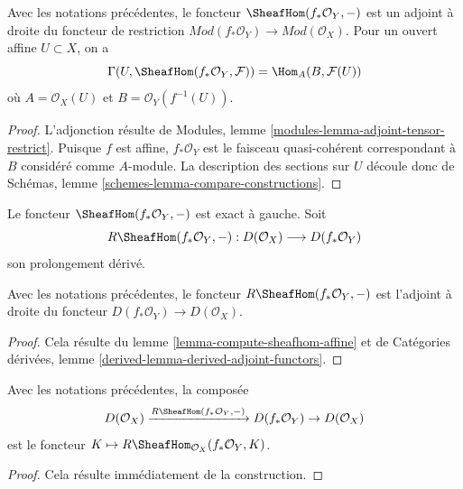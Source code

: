 \begin{lemma}
\label{lemma-compute-sheafhom-affine}
Avec les notations précédentes, le foncteur $\SheafHom(f_*\mathcal{O}_Y, -)$ est un adjoint à droite du foncteur de restriction $\textit{Mod}(f_*\mathcal{O}_Y) \to \textit{Mod}(\mathcal{O}_X)$. Pour un ouvert affine $U \subset X$, on a
$$
\Gamma(U, \SheafHom(f_*\mathcal{O}_Y, \mathcal{F})) =
\Hom_A(B, \mathcal{F}(U))
$$
où $A = \mathcal{O}_X(U)$ et $B = \mathcal{O}_Y(f^{-1}(U))$.
\end{lemma}

\begin{proof}
L'adjonction résulte de Modules, lemme \ref{modules-lemma-adjoint-tensor-restrict}. Puisque $f$ est affine, $f_*\mathcal{O}_Y$ est le faisceau quasi-cohérent correspondant à $B$ considéré comme $A$-module. La description des sections sur $U$ découle donc de Schémas, lemme \ref{schemes-lemma-compare-constructions}.
\end{proof}

\noindent
Le foncteur $\SheafHom(f_*\mathcal{O}_Y, -)$ est exact à gauche. Soit
$$
R\SheafHom(f_*\mathcal{O}_Y, -) :
D(\mathcal{O}_X)
\longrightarrow
D(f_*\mathcal{O}_Y)
$$
son prolongement dérivé.

\begin{lemma}
\label{lemma-sheafhom-affine-adjoint}
Avec les notations précédentes, le foncteur $R\SheafHom(f_*\mathcal{O}_Y, -)$ est l'adjoint à droite du foncteur $D(f_*\mathcal{O}_Y) \to D(\mathcal{O}_X)$.
\end{lemma}

\begin{proof}
Cela résulte du lemme \ref{lemma-compute-sheafhom-affine} et de Catégories dérivées, lemme \ref{derived-lemma-derived-adjoint-functors}.
\end{proof}

\begin{lemma}
\label{lemma-sheafhom-affine-ext}
Avec les notations précédentes, la composée
$$
D(\mathcal{O}_X) \xrightarrow{R\SheafHom(f_*\mathcal{O}_Y, -)}
D(f_*\mathcal{O}_Y) \to D(\mathcal{O}_X)
$$
est le foncteur $K \mapsto R\SheafHom_{\mathcal{O}_X}(f_*\mathcal{O}_Y, K)$.
\end{lemma}

\begin{proof}
Cela résulte immédiatement de la construction.
\end{proof}

